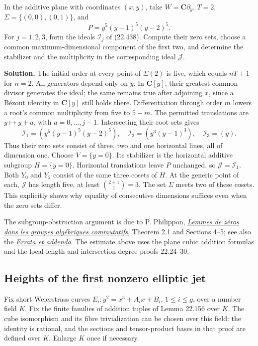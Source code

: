 \documentclass[
  11pt,
  a4paper,
]{article}
\begin{document}
In the additive plane with coordinates \((x,y)\), take
\(W=\mathbf C\partial_y\), \(T=2\), \(\Sigma=\{(0,0),(0,1)\}\), and \[
 P=y^5(y-1)^5(y-2)^5.
 \tag{22.448}
\] For \(j=1,2,3\), form the ideals \(\mathcal I_j\) of (22.438).
Compute their zero sets, choose a common maximum-dimensional component
of the first two, and determine the stabilizer and the multiplicity in
the corresponding ideal \(\mathcal J\).

\textbf{Solution.} The initial order at every point of \(\Sigma(2)\) is
five, which equals \(nT+1\) for \(n=2\). All generators depend only on
\(y\). In \(\mathbf C[y]\), their greatest common divisor generates the
ideal; the same remains true after adjoining \(x\), since a Bézout
identity in \(\mathbf C[y]\) still holds there. Differentiation through
order \(m\) lowers a root's common multiplicity from five to \(5-m\).
The permitted translations are \(y\mapsto y+a\), with
\(a=0,\ldots,j-1\). Intersecting their root sets gives \[
 \mathcal I_1=(y^5(y-1)^5(y-2)^5),\quad
 \mathcal I_2=(y^3(y-1)^3),\quad
 \mathcal I_3=(y).
 \tag{22.449}
\] Thus their zero sets consist of three, two and one horizontal lines,
all of dimension one. Choose \(V=\{y=0\}\). Its stabilizer is the
horizontal additive subgroup \(H=\{y=0\}\). Horizontal translations
leave \(P\) unchanged, so \(\mathcal J=\mathcal I_1\). Both \(Y_0\) and
\(Y_2\) consist of the same three cosets of \(H\). At the generic point
of each, \(\mathcal J\) has length five, at least \(\binom{2+1}{1}=3\).
The set \(\Sigma\) meets two of these cosets. This explicitly shows why
equality of consecutive dimensions suffices even when the zero sets
differ.

The subgroup-obstruction argument is due to P. Philippon,
\href{https://www.numdam.org/item/10.24033/bsmf.2060.pdf}{\emph{Lemmes
de zéros dans les groupes algébriques commutatifs}}, Theorem 2.1 and
Sections 4--5; see also the
\href{https://www.numdam.org/item/10.24033/bsmf.2084.pdf}{\emph{Errata
et addenda}}. The estimate above uses the plane cubic addition formulas
and the local-length and intersection-degree proofs 22.24--30.

\subsection{Heights of the first nonzero elliptic
jet}\label{heights-of-the-first-nonzero-elliptic-jet}

Fix short Weierstrass curves \(E_i:y^2=x^3+A_ix+B_i\), \(1\le i\le g\),
over a number field \(K\). Fix the finite families of addition tuples of
Lemma 22.156 over \(K\). The cube isomorphism and its fibre
trivialization can be chosen over this field: the identity is rational,
and the sections and tensor-product bases in that proof are defined over
\(K\). Enlarge \(K\) once if necessary.
\end{document}
